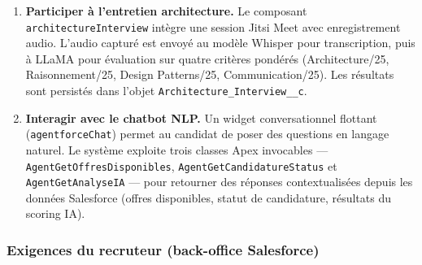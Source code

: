 \begin{enumerate}[label=\textbf{EF-C\arabic*}]
    \item \textbf{Participer à l'entretien architecture.} Le composant \texttt{architectureInterview} intègre une session Jitsi Meet avec enregistrement audio. L'audio capturé est envoyé au modèle Whisper pour transcription, puis à LLaMA pour évaluation sur quatre critères pondérés (Architecture/25, Raisonnement/25, Design Patterns/25, Communication/25). Les résultats sont persistés dans l'objet \texttt{Architecture\_Interview\_\_c}.
    
    \item \textbf{Interagir avec le chatbot NLP.} Un widget conversationnel flottant (\texttt{agentforceChat}) permet au candidat de poser des questions en langage naturel. Le système exploite trois classes Apex invocables --- \texttt{AgentGetOffresDisponibles}, \texttt{AgentGetCandidatureStatus} et \texttt{AgentGetAnalyseIA} --- pour retourner des réponses contextualisées depuis les données Salesforce (offres disponibles, statut de candidature, résultats du scoring IA).
\end{enumerate}

\subsubsection{Exigences du recruteur (back-office Salesforce)}

